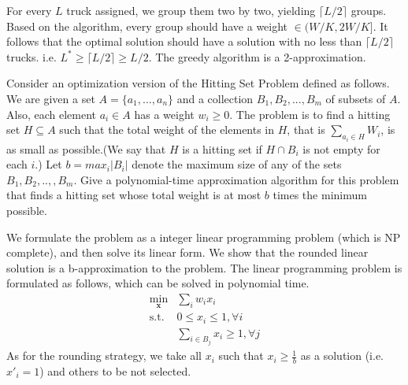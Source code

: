 \begin{exercise}[]
\begin{solution}
\begin{enumerate}
      For every $L$ truck assigned, we group them two by two, yielding $\lceil L/2 \rceil$ groups. Based on the algorithm, every group should have a weight $\in (W/K, 2W/K]$. It follows that the optimal solution should have a solution with no less than $\lceil L/2 \rceil$ trucks. i.e. $L^{*} \ge \lceil L/2 \rceil \ge L/2$. The greedy algorithm is a 2-approximation.  
    \end{enumerate}
  \end{solution}
  \label{ex1}
\end{exercise}


\begin{exercise}[]{Consider an optimization version of the Hitting Set Problem defined as follows. We are given a set $A=\{a_1,...,a_n\}$ and a collection $B_1, B_2, . . . , B_m$ of subsets of $A$. Also, each element $a_i \in A$ has a weight $w_i \geqslant  0$. The problem is to find a hitting set $H \subseteq A$ such that the total weight of the elements in $H$, that is $\sum_{a_i\in H}W_i$, is as small as possible.(We 
    say that $H$ is a hitting set if $H \cap B_i$ is not empty for each $i$.) Let $b = max_i |B_i|$ denote the maximum size of any of the sets $B_1, B_2, ..,, B_m$. Give a polynomial-time approximation algorithm for this problem that finds a hitting set whose total weight is at most $b$ times the minimum possible.
    
    }
  \begin{solution} We formulate the problem as a integer linear programming problem (which is NP complete), and then solve its linear form. We show that the rounded linear solution is a b-approximation to the problem. The linear programming problem is formulated as follows, which can be solved in polynomial time.
    \begin{equation}
      \begin{array}{ll}
        \min_{\mathbf{x}} & \sum_{i} w_i x_i \\
        \text{s.t.} & 0 \le x_{i} \le 1, \forall i \\
        & \sum_{i \in B_j} x_{i} \ge 1 , \forall j
      \end{array}
    \end{equation}
  As for the rounding strategy, we take all $x_i$ such that $x_i \ge \frac{1}{b}$ as a solution (i.e. $x'_i = 1$) and others to be not selected.


\end{solution}
\end{exercise}
